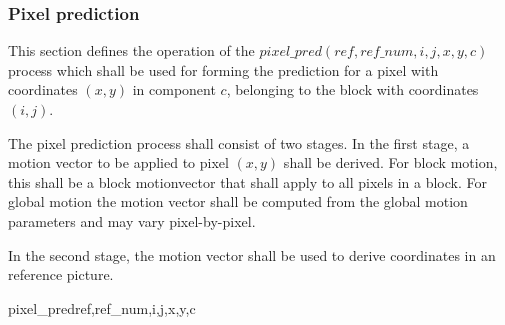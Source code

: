 \begin{comment}
The weighting factors we would like to use for unidirectionally 
redicted blocks in the scaling case
are $2W_1$ and $2W_2$ - the factor 2 takes into account that 
we're only adding in one prediction
value as against two for bidirectional prediction. These factors differ f
rom $W_1+W_2$, and hence
unidirectional prediction is incorrect when there are two references. 
Note, however, that we can
still perform prediction with the correct scaling values when we 
only have a single reference. Note
also that the value of $W_1+W_2$ was selected instead of 
$2^\RefsWeightPrecision$, which
would be equivalent in the interpolative case, as it gives a 
better approximation when the
weights do not sum to $2^\RefsWeightPrecision$.
\end{informative*}
\end{comment}

\subsubsection{Pixel prediction}
\label{pixelprediction}

This section defines the operation of the $pixel\_pred(ref, ref\_num, i, j, x, y, c)$ 
process which shall be used for forming the prediction for a pixel 
with coordinates $(x,y)$ in component $c$, belonging to the block with coordinates $(i,j)$.

The pixel prediction process shall consist of two stages. In the first stage, a motion vector
 to be applied to pixel $(x,y)$ shall be derived. For block motion, this shall be a block
 motionvector that shall apply to all pixels in a block. For global motion the motion
vector shall be computed from the global motion parameters and may vary pixel-by-pixel.

In the second stage, the motion vector shall be used to derive coordinates in an reference picture.

\begin{pseudo}{pixel\_pred}{ref,ref\_num,i,j,x,y,c}
\bsIF{\BlockData[j][i][\GMode]==\false}
\bsELSE
\bsEND
{}
\bsEND
{}
\bsELSE
\bsEND
\end{pseudo}

